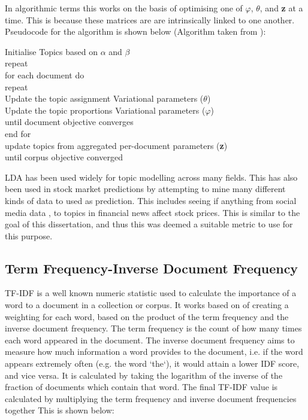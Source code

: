 In algorithmic terms this works on the basis of optimising one of $\varphi$, $\theta$, and \textbf{z} at a time. This is because these matrices are are intrinsically linked to one another. Pseudocode for the algorithm is shown below (Algorithm taken from \cite{ldaalgorithm}):
\begin{algorithm}
	\begin{algorithmic}
	\STATE Initialise Topics based on $\alpha$ and $\beta$\\
	repeat\\ 
	\hspace{1cm} for each document do\\
			\hspace{2cm} repeat\\ 
				\hspace{3cm}Update the topic assignment Variational parameters ($\theta$)\\
				\hspace{3cm}Update the topic proportions Variational parameters ($\varphi$)\\
			\hspace{2cm}until document objective converges\\
		\hspace{1cm}end for\\ 
		\hspace{1cm}update topics from aggregated per-document parameters (\textbf{z})\\
	until corpus objective converged\\
		\end{algorithmic}
\end{algorithm}

LDA has been used widely for topic modelling across many fields.  This has also been used in stock market predictions by attempting to mine many different kinds of data to used as prediction. This includes seeing if anything from social media data \cite{nguyen2015sentiment}, to topics in financial news \cite{feuerriegel2016analysis} affect stock prices. This is similar to the goal of this dissertation, and thus this was deemed a suitable metric to use for this purpose. 
 \subsection{Term Frequency-Inverse Document Frequency}
 TF-IDF is a well known numeric statistic used to calculate the importance of a word to a document in a collection or corpus. It works based on of creating a weighting for each word, based on the product of the term frequency and the inverse document frequency. The term frequency is the count of how many times each word appeared in the document. The inverse document frequency aims to measure how much information a word provides to the document, i.e. if the word appears extremely often (e.g. the word `the`), it would attain a lower IDF score, and vice versa. It is calculated by taking the logarithm of the inverse of the fraction of documents which contain that word. The final TF-IDF value is calculated by multiplying the term frequency and inverse document frequencies together This is shown below:
 
